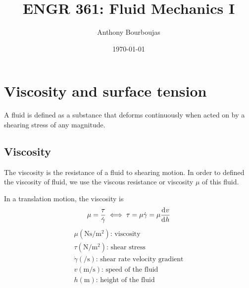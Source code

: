 \documentclass[10pt, twocolumn]{article}
\title{ENGR 361: Fluid Mechanics I}
\date{\today}
\author{Anthony Bourboujas}
\begin{document}
\maketitle %

\section{Viscosity and surface tension}
A fluid is defined as a substance that deforms continuously when acted on by a shearing stress of any magnitude.

\subsection{Viscosity}
The viscosity is the resistance of a fluid to shearing motion.
In order to defined the viscosity of fluid, we use the viscous resistance or viscosity \(\mu\) of this fluid.

In a translation motion, the viscosity is
\[
  \mu = \frac{\tau}{\dot{\gamma}} \iff \tau = \mu \dot{\gamma} = \mu \frac{\mathrm{d}^{} v}{\mathrm{d}^{} h}
\]
\[
  \begin{array}{|l}
    \mu (\si{\newton\second\per\metre\squared}) \text{: viscosity}        \\
    \tau (\si{\newton\per\metre\squared}) \text{: shear stress}           \\
    \dot{\gamma} (\si{\per\second}) \text{: shear rate velocity gradient} \\
    v (\si{\metre\per\second}) \text{: speed of the fluid}                \\
    h (\si{\metre}) \text{: height of the fluid}
  \end{array}
\]
\end{document}
